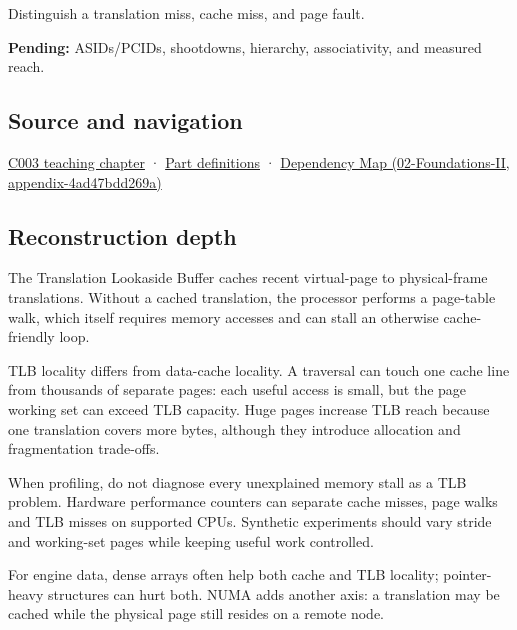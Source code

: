 Distinguish a translation miss, cache miss, and page fault.

\textbf{Pending:} ASIDs/PCIDs, shootdowns, hierarchy, associativity, and measured reach.

\subsection{Source and navigation}\label{appendix-7a2d9c5ce511-source-and-navigation}

\hyperref[01-foundations-i-ch002-where-the-bytes-live]{C003 teaching chapter} · \hyperref[appendix-fd090d982a15-m003---parts-41-60]{Part definitions} · \href{../02-Foundations-II/main.pdf\#nameddest=appendix-4ad47bdd269a}{Dependency Map (02-Foundations-II, appendix-4ad47bdd269a)}

\subsection{Reconstruction depth}\label{appendix-7a2d9c5ce511-reconstruction-depth}

The Translation Lookaside Buffer caches recent virtual-page to physical-frame translations. Without a cached translation, the processor performs a page-table walk, which itself requires memory accesses and can stall an otherwise cache-friendly loop.

TLB locality differs from data-cache locality. A traversal can touch one cache line from thousands of separate pages: each useful access is small, but the page working set can exceed TLB capacity. Huge pages increase TLB reach because one translation covers more bytes, although they introduce allocation and fragmentation trade-offs.

When profiling, do not diagnose every unexplained memory stall as a TLB problem. Hardware performance counters can separate cache misses, page walks and TLB misses on supported CPUs. Synthetic experiments should vary stride and working-set pages while keeping useful work controlled.

For engine data, dense arrays often help both cache and TLB locality; pointer-heavy structures can hurt both. NUMA adds another axis: a translation may be cached while the physical page still resides on a remote node.
